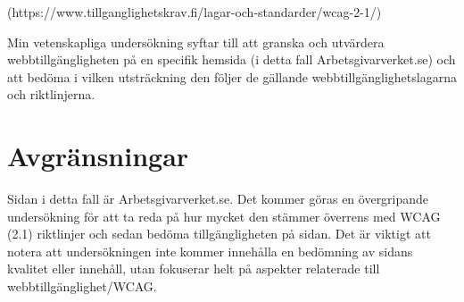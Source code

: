 \documentclass[11p]{article}
\begin{document}
(https://www.tillganglighetskrav.fi/lagar-och-standarder/wcag-2-1/)


Min vetenskapliga undersökning syftar till att granska och utvärdera webbtillgängligheten
på en specifik hemsida (i detta fall Arbetsgivarverket.se) och att bedöma
i vilken utsträckning den följer de gällande webbtillgänglighetslagarna och riktlinjerna.
\section{Avgränsningar}
Sidan i detta fall är Arbetsgivarverket.se.
Det kommer göras en övergripande undersökning för att ta reda på hur mycket den stämmer överrens med WCAG (2.1) riktlinjer
och sedan bedöma tillgängligheten på sidan.
Det är viktigt att notera att undersökningen inte kommer innehålla en bedömning av sidans kvalitet eller innehåll, utan fokuserar
helt på aspekter relaterade till webbtillgänglighet/WCAG.






\printbibliography
\end{document}
